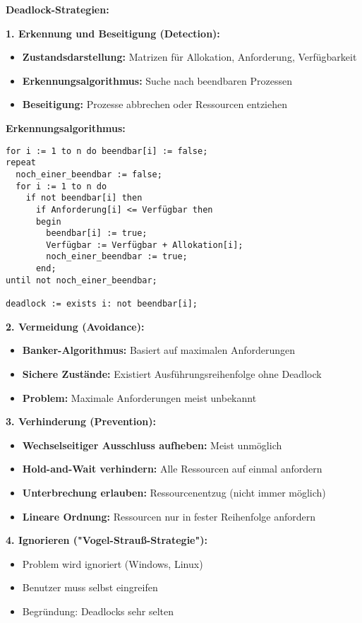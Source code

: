 \documentclass[9pt,a4paper]{extarticle}
\begin{document}
\begin{multicols*}{2}
\textbf{Deadlock-Strategien:}

\textbf{1. Erkennung und Beseitigung (Detection):}
\begin{itemize}
\item \textbf{Zustandsdarstellung:} Matrizen für Allokation, Anforderung, Verfügbarkeit
\item \textbf{Erkennungsalgorithmus:} Suche nach beendbaren Prozessen
\item \textbf{Beseitigung:} Prozesse abbrechen oder Ressourcen entziehen
\end{itemize}

\textbf{Erkennungsalgorithmus:}
\begin{verbatim}
for i := 1 to n do beendbar[i] := false;
repeat
  noch_einer_beendbar := false;
  for i := 1 to n do
    if not beendbar[i] then
      if Anforderung[i] <= Verfügbar then
      begin
        beendbar[i] := true;
        Verfügbar := Verfügbar + Allokation[i];
        noch_einer_beendbar := true;
      end;
until not noch_einer_beendbar;

deadlock := exists i: not beendbar[i];
\end{verbatim}

\textbf{2. Vermeidung (Avoidance):}
\begin{itemize}
\item \textbf{Banker-Algorithmus:} Basiert auf maximalen Anforderungen
\item \textbf{Sichere Zustände:} Existiert Ausführungsreihenfolge ohne Deadlock
\item \textbf{Problem:} Maximale Anforderungen meist unbekannt
\end{itemize}

\textbf{3. Verhinderung (Prevention):}
\begin{itemize}
\item \textbf{Wechselseitiger Ausschluss aufheben:} Meist unmöglich
\item \textbf{Hold-and-Wait verhindern:} Alle Ressourcen auf einmal anfordern
\item \textbf{Unterbrechung erlauben:} Ressourcenentzug (nicht immer möglich)
\item \textbf{Lineare Ordnung:} Ressourcen nur in fester Reihenfolge anfordern
\end{itemize}

\textbf{4. Ignorieren ("Vogel-Strauß-Strategie"):}
\begin{itemize}
\item Problem wird ignoriert (Windows, Linux)
\item Benutzer muss selbst eingreifen
\item Begründung: Deadlocks sehr selten
\end{itemize}


\end{multicols*}
\end{document}

